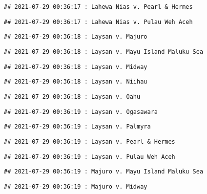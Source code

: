 \documentclass[
]{article}
\begin{document}
\begin{verbatim}
## 2021-07-29 00:36:17 : Lahewa Nias v. Pearl & Hermes
\end{verbatim}

\begin{verbatim}
## 2021-07-29 00:36:17 : Lahewa Nias v. Pulau Weh Aceh
\end{verbatim}

\begin{verbatim}
## 2021-07-29 00:36:18 : Laysan v. Majuro
\end{verbatim}

\begin{verbatim}
## 2021-07-29 00:36:18 : Laysan v. Mayu Island Maluku Sea
\end{verbatim}

\begin{verbatim}
## 2021-07-29 00:36:18 : Laysan v. Midway
\end{verbatim}

\begin{verbatim}
## 2021-07-29 00:36:18 : Laysan v. Niihau
\end{verbatim}

\begin{verbatim}
## 2021-07-29 00:36:18 : Laysan v. Oahu
\end{verbatim}

\begin{verbatim}
## 2021-07-29 00:36:19 : Laysan v. Ogasawara
\end{verbatim}

\begin{verbatim}
## 2021-07-29 00:36:19 : Laysan v. Palmyra
\end{verbatim}

\begin{verbatim}
## 2021-07-29 00:36:19 : Laysan v. Pearl & Hermes
\end{verbatim}

\begin{verbatim}
## 2021-07-29 00:36:19 : Laysan v. Pulau Weh Aceh
\end{verbatim}

\begin{verbatim}
## 2021-07-29 00:36:19 : Majuro v. Mayu Island Maluku Sea
\end{verbatim}

\begin{verbatim}
## 2021-07-29 00:36:19 : Majuro v. Midway
\end{verbatim}
\end{document}
